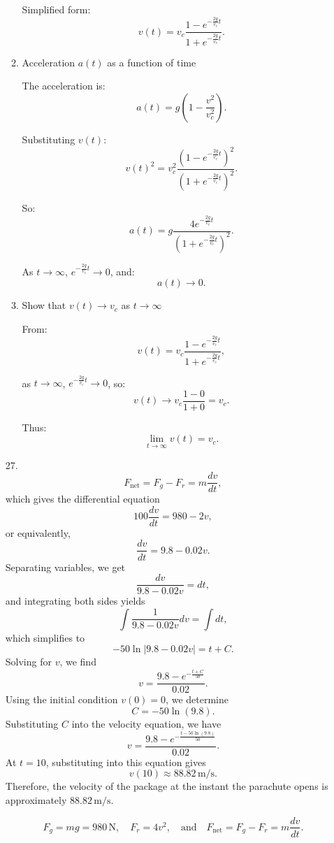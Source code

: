 \documentclass[12pt]{article}
\begin{document}
\begin{enumerate}
\begin{enumerate}
    Simplified form:
    \[
    v(t) = v_c \frac{1 - e^{-\frac{2g}{v_c}t}}{1 + e^{-\frac{2g}{v_c}t}}.
    \]

    \item Acceleration $a(t)$ as a function of time

    The acceleration is:
    \[
    a(t) = g \left( 1 - \frac{v^2}{v_c^2} \right).
    \]

    Substituting $v(t)$:
    \[
    v(t)^2 = v_c^2 \frac{(1 - e^{-\frac{2g}{v_c}t})^2}{(1 + e^{-\frac{2g}{v_c}t})^2}.
    \]

    So:
    \[
    a(t) = g \frac{4e^{-\frac{2g}{v_c}t}}{(1 + e^{-\frac{2g}{v_c}t})^2}.
    \]

    As $t \to \infty$, $e^{-\frac{2g}{v_c}t} \to 0$, and:
    \[
    a(t) \to 0.
    \]

    \item Show that $v(t) \to v_c$ as $t \to \infty$

    From:
    \[
    v(t) = v_c \frac{1 - e^{-\frac{2g}{v_c}t}}{1 + e^{-\frac{2g}{v_c}t}},
    \]

    as $t \to \infty$, $e^{-\frac{2g}{v_c}t} \to 0$, so:
    \[
    v(t) \to v_c \frac{1 - 0}{1 + 0} = v_c.
    \]

    Thus:
    \[
    \lim_{t \to \infty} v(t) = v_c.
    \]

\end{enumerate}

\item [27.] 
\[
F_{\text{net}} = F_g - F_r = m \frac{dv}{dt},
\] 
which gives the differential equation 
\[
100 \frac{dv}{dt} = 980 - 2v,
\] 
or equivalently, 
\[
\frac{dv}{dt} = 9.8 - 0.02v.
\] 
Separating variables, we get 
\[
\frac{dv}{9.8 - 0.02v} = dt,
\] 
and integrating both sides yields 
\[
\int \frac{1}{9.8 - 0.02v} dv = \int dt,
\] 
which simplifies to 
\[
-50 \ln|9.8 - 0.02v| = t + C.
\] 
Solving for \( v \), we find 
\[
v = \frac{9.8 - e^{-\frac{t + C}{50}}}{0.02}.
\] 
Using the initial condition \( v(0) = 0 \), we determine 
\[
C = -50 \ln(9.8).
\] 
Substituting \( C \) into the velocity equation, we have 
\[
v = \frac{9.8 - e^{-\frac{t - 50\ln(9.8)}{50}}}{0.02}.
\] 
At \( t = 10 \), substituting into this equation gives 
\[
v(10) \approx 88.82 \, \text{m/s}.
\] 
Therefore, the velocity of the package at the instant the parachute opens is approximately \( 88.82 \, \text{m/s} \).

\[
F_g = mg = 980 \, \text{N}, \quad F_r = 4v^2, \quad \text{and} \quad F_{\text{net}} = F_g - F_r = m \frac{dv}{dt}.
\]


\end{enumerate}
\end{document}
